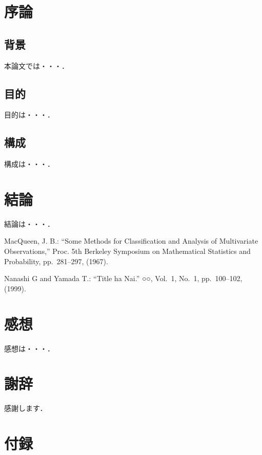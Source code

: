 \documentclass[11pt,oneside,openany,uplatex,dvipdfmx]{jsbook}
\theoremstyle{definition} \newtheorem{theorem}{定理}
\begin{document}
\frontmatter
\tableofcontents
\listoffigures
\listoftables

\mainmatter
\chapter{序論}
\def\thepage{\arabic{page}}
\setcounter{page}{1}\label{chap:Intro}
\section{背景}
\label{sec:Intro_Background}
本論文では・・・．
\section{目的}
\label{sec:Intro_Purpose}
目的は・・・．
\section{構成}
\label{sec:Intro_Contents}
構成は・・・．
\chapter{結論}
\label{chap:Conculusion}
結論は・・・．
\begin{thebibliography}{99}
  MacQueen, J. B.: 
  ``Some Methods for Classification and
  Analysis of Multivariate Observations,''
  Proc. 5th Berkeley Symposium on Mathematical Statistics and Probability,
  pp.~281--297, (1967).
\end{thebibliography}
  \makeatletter 
  \renewcommand{\bibname}{代表的な研究業績}
  \renewcommand{\@biblabel}[1]{(#1)}
  \makeatother
  \begin{thebibliography}{99}
    Nanashi G and Yamada T.: ``Title ha Nai.''
    ○○, Vol.~1, No.~1, pp.~100--102, (1999).
  \end{thebibliography}
  \backmatter
  \chapter*{感想}
  \label{chap:feel}
  感想は・・・．
   \chapter*{謝辞}
   \label{chap:ack}
   感謝します．
   \chapter*{付録}
   \label{chap:program}
 
\end{document}
